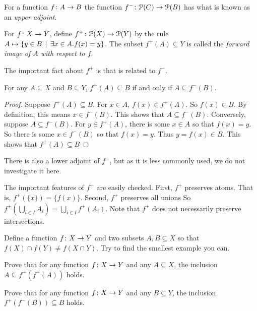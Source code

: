 For a function ${f}\colon{A}\to{B}$ the function ${f^-}\colon{{\mathcal{P}}(C)}\to{{\mathcal{P}}(B)}$ has what is known as an \emph{upper adjoint}. 

\begin{defn}
	For ${f}\colon{X}\to{Y}$, define ${f^+}\colon{{\mathcal{P}}(X)}\to{{\mathcal{P}}(Y)}$ by the rule $A\mapsto \{y\in B\,\mid\, \exists x\in A.f(x)=y\}$. The subset 
	$f^+(A)\subseteq Y$ is called the \emph{forward image of $A$ with respect to $f$}.
\end{defn}

The important fact about $f^+$ is that is related to $f^-$.

\begin{lemma}
	For any $A\subseteq X$ and $B\subseteq Y$,
	$f^+(A)\subseteq B$ if and only if $A\subseteq f^-(B)$.
	
	\begin{proof}
		Suppose $f^+(A)\subseteq B$. For $x\in A$, $f(x)\in f^+(A)$. So $f(x)\in B$.
		By definition, this means $x\in f^-(B)$. This shows that $A\subseteq f^-(B)$.
		Conversely, suppose $A\subseteq f^-(B)$.
		For $y\in f^+(A)$, there is some $x\in A$ so that $f(x)=y$.
		So there is some $x\in f^-(B)$ so that $f(x)=y$.
		Thus $y=f(x)\in B$.
		This shows that $f^+(A)\subseteq B$
	\end{proof}
\end{lemma}

There is also a lower adjoint of $f^-$, but as it is less commonly used, we do not investigate it here.

The important features of $f^+$ are easily checked. 
First, $f^+$ preserves atoms.
That is, $f^+(\{x\}) = \{f(x)\}$. 
Second, $f^+$ preserves all unions So $f^+(\bigcup_{i\in I}A_i) = \bigcup_{i\in I}f^+(A_i)$. Note that $f^+$ does not necessarily preserve intersections.

\begin{exercises}
	\begin{nextexercise}
		\item Define a function ${f}\colon{X}\to{Y}$ and two subsets $A,B\subseteq X$ so that $f(X)\cap f(Y) \neq f(X\cap Y)$. Try to find the smallest example you can.
		\item Prove that for any function ${f}\colon{X}\to{Y}$ and any $A\subseteq X$, the inclusion $A\subseteq f^-(f^+(A))$ holds.
		\item Prove that for any function ${f}\colon{X}\to{Y}$ and any $B\subseteq Y$, the inclusion $f^+(f^-(B))\subseteq B$ holds.
	\end{nextexercise}
\end{exercises}


